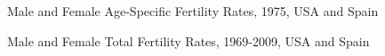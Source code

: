  \FloatBarrier
\begin{figure}[ht!]
        \centering  
          \caption{Male and Female Age-Specific Fertility Rates, 1975, USA and
          Spain}
          \label{fig:ASFR1975}
\end{figure}

\begin{figure}[ht!]
        \centering  
          \caption{Male and Female Total Fertility Rates, 1969-2009, USA and
          Spain}
          \label{fig:TFRseries}
\end{figure}

